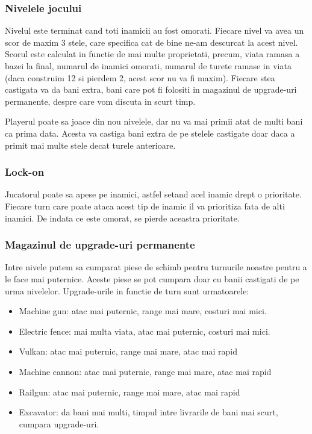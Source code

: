 \documentclass[12pt, a4paper]{article}
\begin{document}
	
	
	\subsubsection{Nivelele jocului}
	
	Nivelul este terminat cand toti inamicii au fost omorati. Fiecare nivel va avea un scor de maxim 3 stele, care specifica cat de bine ne-am descurcat la acest nivel. Scorul este calculat in functie de mai multe proprietati, precum, viata ramasa a bazei la final, numarul de inamici omorati, numarul de turete ramase in viata (daca construim 12 si pierdem 2, acest scor nu va fi maxim). Fiecare stea castigata va da bani extra, bani care pot fi folositi in magazinul de upgrade-uri permanente, despre care vom discuta in scurt timp.
	
	Playerul poate sa joace din nou nivelele, dar nu va mai primii atat de multi bani ca prima data. Acesta va castiga bani extra de pe stelele castigate doar daca a primit mai multe stele decat turele anterioare.
	
	
	
	\subsubsection{Lock-on}
	
	Jucatorul poate sa apese pe inamici, astfel setand acel inamic drept o prioritate. Fiecare turn care poate ataca acest tip de inamic il va prioritiza fata de alti inamici. De indata ce este omorat, se pierde aceastra prioritate.
	
	
	
	\subsubsection{Magazinul de upgrade-uri permanente}
	
	Intre nivele putem sa cumparat piese de schimb pentru turnurile noastre pentru a le face mai puternice. Aceste piese se pot cumpara doar cu banii castigati de pe urma nivelelor. Upgrade-urile in functie de turn sunt urmatoarele:
	
	\begin{itemize}
		\item Machine gun: atac mai puternic, range mai mare, costuri mai mici.
		\item Electric fence: mai multa viata, atac mai puternic, costuri mai mici.
		\item Vulkan: atac mai puternic, range mai mare, atac mai rapid
		\item Machine cannon: atac mai puternic, range mai mare, atac mai rapid
		\item Railgun: atac mai puternic, range mai mare, atac mai rapid
		\item Excavator: da bani mai multi, timpul intre livrarile de bani mai scurt, cumpara upgrade-uri.
	\end{itemize}
	
\end{document}
